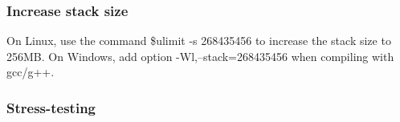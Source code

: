 \subsubsection{Increase stack size}

On Linux, use the command \$ulimit -s 268435456 to increase the stack size to 256MB. On Windows, add option -Wl,--stack=268435456 when compiling with gcc/g++.

\subsubsection{Stress-testing}
